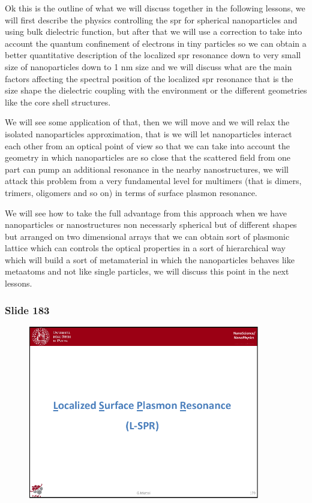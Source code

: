 \documentclass[../main/main.tex]{subfiles}
\begin{document}
Ok this is the outline of what we will discuss together in the following lessons, we will first describe the physics controlling the spr for spherical nanoparticles and using bulk dielectric function, but after that we will use a correction to take into account the quantum confinement of electrons in tiny particles so we can obtain a better quantitative description of the localized spr resonance down to very small size of nanoparticles down to 1 nm size and we will discuss what are the main factors affecting the spectral position of the localized spr resonance that is the size shape the dielectric coupling with the environment or the different geometries like the core shell structures. 

We will see some application of that, then we will move and we will relax the isolated nanoparticles approximation, that is we will let nanoparticles interact each other from an optical point of view so that we can take into account the geometry in which nanoparticles are so close that the scattered field from one part can pump an additional resonance in the nearby nanostructures, we will attack this problem from a very fundamental level for multimers (that is dimers, trimers, oligomers and so on) in terms of surface plasmon resonance. 

We will see how to take the full advantage from this approach when we have nanoparticles or nanostructures non necessarly spherical but of different shapes but arranged on two dimensional arrays that we can obtain sort of plasmonic lattice which can controls the optical properties in a sort of hierarchical way which will build a sort of metamaterial in which the nanoparticles behaves like metaatoms and not like single particles, we will discuss this point in the next lessons. 

\newpage

\subsubsection{Slide 183}

\begin{figure}[h!]
\centering
\includegraphics[page=5,width=0.9\textwidth]{../lessons/pdf_file/11_lesson.pdf}
\end{figure}
\end{document}
